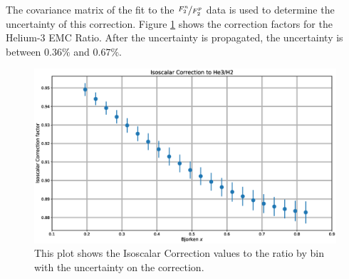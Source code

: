 The covariance matrix of the fit to the $\nicefrac{F_2^n}{F_2^p}$ data is used to determine the uncertainty of this correction. Figure \ref{fig:isocor} shows the correction factors for the Helium-3 EMC Ratio. After the uncertainty is propagated, the uncertainty is between $0.36\%$ and $0.67\%$.

\begin{figure}
	\includegraphics[width=\textwidth]{./analysis/fig/isocor.eps}
	\caption{This plot shows the Isoscalar Correction values to the  ratio by bin with the uncertainty on the correction.}
	\label{fig:isocor}
\end{figure}


